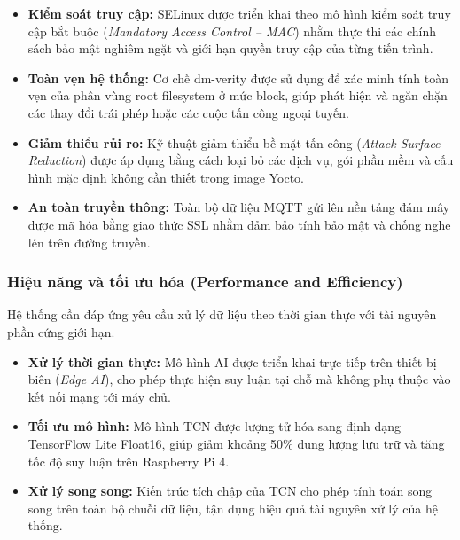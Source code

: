 \begin{itemize}
    \item \textbf{Kiểm soát truy cập:}  
    SELinux được triển khai theo mô hình kiểm soát truy cập bắt buộc (\textit{Mandatory Access Control -- MAC}) nhằm thực thi các chính sách bảo mật nghiêm ngặt và giới hạn quyền truy cập của từng tiến trình.

    \item \textbf{Toàn vẹn hệ thống:}  
    Cơ chế dm-verity được sử dụng để xác minh tính toàn vẹn của phân vùng root filesystem ở mức block, giúp phát hiện và ngăn chặn các thay đổi trái phép hoặc các cuộc tấn công ngoại tuyến.

    \item \textbf{Giảm thiểu rủi ro:}  
    Kỹ thuật giảm thiểu bề mặt tấn công (\textit{Attack Surface Reduction}) được áp dụng bằng cách loại bỏ các dịch vụ, gói phần mềm và cấu hình mặc định không cần thiết trong image Yocto.

    \item \textbf{An toàn truyền thông:}  
    Toàn bộ dữ liệu MQTT gửi lên nền tảng đám mây được mã hóa bằng giao thức SSL nhằm đảm bảo tính bảo mật và chống nghe lén trên đường truyền.
\end{itemize}

\subsubsection{Hiệu năng và tối ưu hóa (Performance and Efficiency)}

Hệ thống cần đáp ứng yêu cầu xử lý dữ liệu theo thời gian thực với tài nguyên phần cứng giới hạn.

\begin{itemize}
    \item \textbf{Xử lý thời gian thực:}  
    Mô hình AI được triển khai trực tiếp trên thiết bị biên (\textit{Edge AI}), cho phép thực hiện suy luận tại chỗ mà không phụ thuộc vào kết nối mạng tới máy chủ.

    \item \textbf{Tối ưu mô hình:}  
    Mô hình TCN được lượng tử hóa sang định dạng TensorFlow Lite Float16, giúp giảm khoảng 50\% dung lượng lưu trữ và tăng tốc độ suy luận trên Raspberry Pi 4.

    \item \textbf{Xử lý song song:}  
    Kiến trúc tích chập của TCN cho phép tính toán song song trên toàn bộ chuỗi dữ liệu, tận dụng hiệu quả tài nguyên xử lý của hệ thống.
\end{itemize}

